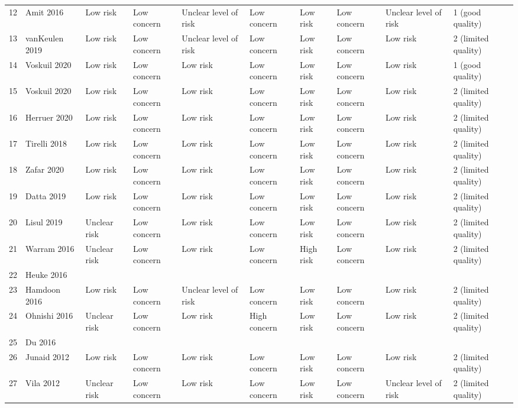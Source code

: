 \begin{table}[ht]
\begin{tabular}{rlllllllll}
  12 & Amit 2016 & Low risk & Low concern & Unclear level of risk & Low concern & Low risk & Low concern & Unclear level of risk & 1 (good quality) \\ 
  13 & vanKeulen 2019 & Low risk & Low concern & Unclear level of risk & Low concern & Low risk & Low concern & Low risk & 2 (limited quality) \\ 
  14 & Voskuil 2020 & Low risk & Low concern & Low risk & Low concern & Low risk & Low concern & Low risk & 1 (good quality) \\ 
  15 & Voskuil 2020 & Low risk & Low concern & Low risk & Low concern & Low risk & Low concern & Low risk & 2 (limited quality) \\ 
  16 & Herruer 2020 & Low risk & Low concern & Low risk & Low concern & Low risk & Low concern & Low risk & 2 (limited quality) \\ 
  17 & Tirelli 2018 & Low risk & Low concern & Low risk & Low concern & Low risk & Low concern & Low risk & 2 (limited quality) \\ 
  18 & Zafar 2020 & Low risk & Low concern & Low risk & Low concern & Low risk & Low concern & Low risk & 2 (limited quality) \\ 
  19 & Datta 2019 & Low risk & Low concern & Low risk & Low concern & Low risk & Low concern & Low risk & 2 (limited quality) \\ 
  20 & Lisul 2019 & Unclear risk & Low concern & Low risk & Low concern & Low risk & Low concern & Low risk & 2 (limited quality) \\ 
  21 & Warram 2016 & Unclear risk & Low concern & Low risk & Low concern & High risk & Low concern & Low risk & 2 (limited quality) \\ 
  22 & Heuke 2016 &  &  &  &  &  &  &  &  \\ 
  23 & Hamdoon 2016 & Low risk & Low concern & Unclear level of risk & Low concern & Low risk & Low concern & Low risk & 2 (limited quality) \\ 
  24 & Ohnishi 2016 & Unclear risk & Low concern & Low risk & High concern & Low risk & Low concern & Low risk & 2 (limited quality) \\ 
  25 & Du 2016 &  &  &  &  &  &  &  &  \\ 
  26 & Junaid 2012 & Low risk & Low concern & Low risk & Low concern & Low risk & Low concern & Low risk & 2 (limited quality) \\ 
  27 & Vila 2012 & Unclear risk & Low concern & Low risk & Low concern & Low risk & Low concern & Unclear level of risk & 2 (limited quality) \\ 

\end{tabular}
\end{table}
